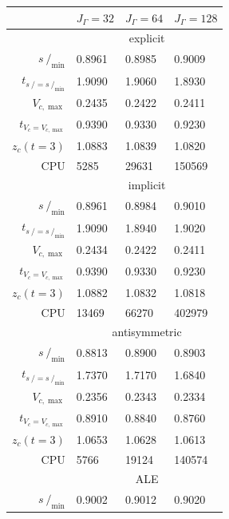 \documentclass[a4paper,12pt,onecolumn]{article}
\newcommand{\strikes}{\mbox{$s\!\!\!\!\:/$}}
\begin{document}
\begin{table}
\center
\hspace*{-3.25cm}
\begin{tabular}{rlll}
\hline
 & $J_\Gamma=32$ & $J_\Gamma=64$ & $J_\Gamma=128$ \\
\hline
& \multicolumn{3}{c}{explicit} \\
\cmidrule{2-4}
$\strikes_{\min}$                & 0.8961 & 0.8985 & 0.9009 \\
$t_{\strikes = \strikes_{\min}}$ & 1.9090 & 1.9060 & 1.8930 \\
$V_{c,\max}$                     & 0.2435 & 0.2422 & 0.2411 \\
$t_{V_c = V_{c,\max}}$           & 0.9390 & 0.9330 & 0.9230 \\
$z_c(t=3)$                       & 1.0883 & 1.0839 & 1.0820 \\
CPU                              &   5285 &  29631 & 150569 \\
\cmidrule{2-4}
& \multicolumn{3}{c}{implicit} \\
\cmidrule{2-4}
$\strikes_{\min}$                & 0.8961 & 0.8984 & 0.9010 \\
$t_{\strikes = \strikes_{\min}}$ & 1.9090 & 1.8940 & 1.9020 \\
$V_{c,\max}$                     & 0.2434 & 0.2422 & 0.2411 \\
$t_{V_c = V_{c,\max}}$           & 0.9390 & 0.9330 & 0.9230 \\
$z_c(t=3)$                       & 1.0882 & 1.0832 & 1.0818 \\
CPU                              &  13469 &  66270 & 402979 \\
\cmidrule{2-4}
& \multicolumn{3}{c}{antisymmetric} \\
\cmidrule{2-4}
$\strikes_{\min}$                & 0.8813 & 0.8900 & 0.8903 \\
$t_{\strikes = \strikes_{\min}}$ & 1.7370 & 1.7170 & 1.6840 \\
$V_{c,\max}$                     & 0.2356 & 0.2343 & 0.2334 \\
$t_{V_c = V_{c,\max}}$           & 0.8910 & 0.8840 & 0.8760 \\
$z_c(t=3)$                       & 1.0653 & 1.0628 & 1.0613 \\
CPU                              &   5766 &  19124 & 140574 \\
\cmidrule{2-4}
& \multicolumn{3}{c}{ALE} \\
\cmidrule{2-4}
$\strikes_{\min}$                & 0.9002 & 0.9012 & 0.9020 \\

\end{tabular}
\end{table}
\end{document}
